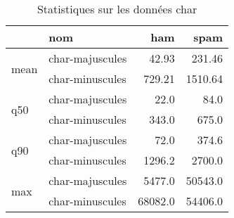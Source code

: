 \begin{table}[H]
\centering
\caption{Statistiques sur les données char}
\label{tab:f_char}
\begin{tabular}{ll|rr}
\toprule
 & nom & ham & spam \\
\midrule
\multirow[c]{2}{*}{mean} & char-majuscules & 42.93 & 231.46 \\
 & char-minuscules & 729.21 & 1510.64 \\
\cline{1-4}
\multirow[c]{2}{*}{q50} & char-majuscules & 22.0 & 84.0 \\
 & char-minuscules & 343.0 & 675.0 \\
\cline{1-4}
\multirow[c]{2}{*}{q90} & char-majuscules & 72.0 & 374.6 \\
 & char-minuscules & 1296.2 & 2700.0 \\
\cline{1-4}
\multirow[c]{2}{*}{max} & char-majuscules & 5477.0 & 50543.0 \\
 & char-minuscules & 68082.0 & 54406.0 \\
\cline{1-4}
\bottomrule
\end{tabular}
\end{table}

